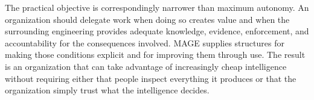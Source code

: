 The practical objective is correspondingly narrower than maximum autonomy. An organization should delegate work when doing so creates value and when the surrounding engineering provides adequate knowledge, evidence, enforcement, and accountability for the consequences involved. MAGE supplies structures for making those conditions explicit and for improving them through use. The result is an organization that can take advantage of increasingly cheap intelligence without requiring either that people inspect everything it produces or that the organization simply trust what the intelligence decides.
